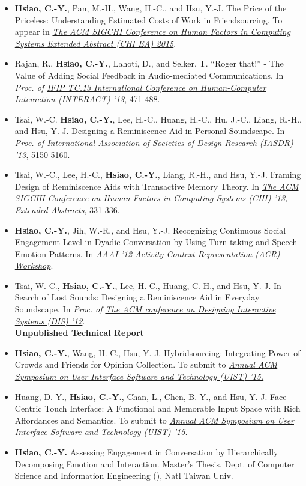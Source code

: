 \documentclass[10pt, a4paper]{article} %
\begin{document}
\begin{itemize}

\itemsep=3pt

\item \textbf{Hsiao, C.-Y.}, Pan, M.-H., Wang, H.-C., and Hsu, Y.-J. 
The Price of the Priceless: Understanding Estimated Costs of Work in Friendsourcing.
To appear in \textit{\href{http://chi2015.acm.org/}{The ACM SIGCHI Conference on Human Factors in Computing Systems Extended Abstract (CHI EA) 2015}}.
\item Rajan, R., \textbf{Hsiao, C.-Y.}, Lahoti, D., and Selker, T. 
``Roger that!'' - The Value of Adding Social Feedback in Audio-mediated Communications. 
In \textit{Proc. of \href{http://www.interact2013.org/}{IFIP TC.13 International Conference on Human-Computer Interaction (INTERACT) '13}}, 471-488.
\item Tsai, W.-C. \textbf{Hsiao, C.-Y.}, Lee, H.-C., Huang, H.-C., Hu, J.-C., Liang, R.-H., and Hsu, Y.-J. 
Designing a Reminiscence Aid in Personal Soundscape. 
In \textit{Proc. of \href{http://www.iasdr2013.jp/}{International Association of Societies of Design Research (IASDR) '13}}, 5150-5160.
\item Tsai, W.-C., Lee, H.-C., \textbf{Hsiao, C.-Y.}, Liang, R.-H., and Hsu, Y.-J. 
Framing Design of Reminiscence Aids with Transactive Memory Theory. 
In \textit{\href{http://chi2013.acm.org/}{The ACM SIGCHI Conference on Human Factors in Computing Systems (CHI) '13, Extended Abstracts}}, 331-336.
\item \textbf{Hsiao, C.-Y.}, Jih, W.-R., and Hsu, Y.-J. 
Recognizing Continuous Social Engagement Level in Dyadic Conversation by Using Turn-taking and Speech Emotion Patterns. 
In \textit{\href{http://activitycontext.org/aaai12-archive/aaai12/}{AAAI '12 Activity Context Representation (ACR) Workshop}}.
\item Tsai, W.-C., \textbf{Hsiao, C.-Y.}, Lee, H.-C., Huang, C.-H., and Hsu, Y.-J. 
In Search of Lost Sounds: Designing a Reminiscence Aid in Everyday Soundscape. 
In \textit{Proc. of \textit{\href{http://www.dis2012.org/}{The ACM conference on Designing Interactive Systems (DIS) '12}}}.\\ 

\textbf{Unpublished Technical Report}
\item \textbf{Hsiao, C.-Y.}, Wang, H.-C., Hsu, Y.-J.
Hybridsourcing: Integrating Power of Crowds and Friends for Opinion Collection.
To submit to \textit{\href{http://http://uist.acm.org/uist2015/}{Annual ACM Symposium on User Interface Software and Technology (UIST) '15.}}
\item Huang, D.-Y., \textbf{Hsiao, C.-Y.}, Chan, L., Chen, B.-Y., and Hsu, Y.-J. 
Face-Centric Touch Interface: A Functional and Memorable Input Space with Rich Affordances and Semantics.
To submit to \textit{\href{http://http://uist.acm.org/uist2015/}{Annual ACM Symposium on User Interface Software and Technology (UIST) '15.}}
\item \textbf{Hsiao, C.-Y.} Assessing Engagement in Conversation by Hierarchically Decomposing Emotion and Interaction. 
Master's Thesis, Dept. of Computer Science and Information Engineering (), Natl Taiwan Univ.


\end{itemize}
\end{document}
